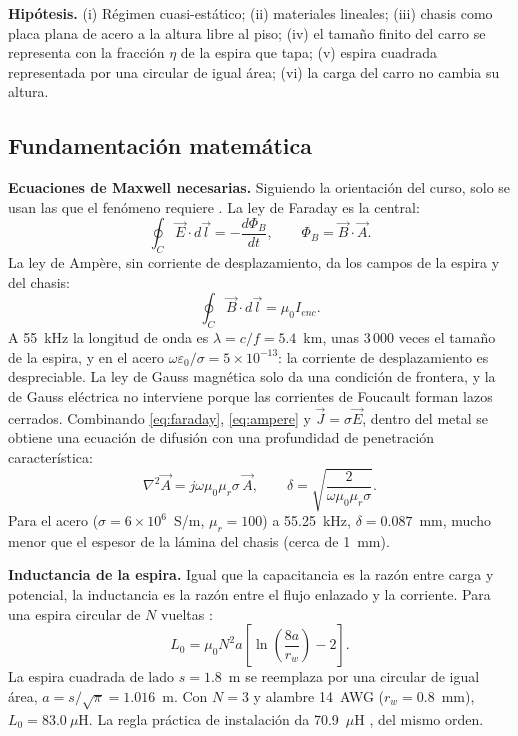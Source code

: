 \documentclass[10pt,onecolumn]{article}
\numberwithin{equation}{section}
\numberwithin{figure}{section}
\numberwithin{table}{section}
\begin{document}
\textbf{Hipótesis.} (i) Régimen cuasi-estático; (ii) materiales lineales; (iii) chasis como placa plana de acero a
la altura libre al piso; (iv) el tamaño finito del carro se representa con la fracción $\eta$ de la espira que tapa;
(v) espira cuadrada representada por una circular de igual área; (vi) la carga del carro no cambia su altura.

\subsection{Fundamentación matemática}

\textbf{Ecuaciones de Maxwell necesarias.} Siguiendo la orientación del curso, solo se usan las que el fenómeno
requiere \cite{griffiths2017,jackson1999}. La ley de Faraday es la central:
\begin{equation}
 \oint_C \vec E\cdot d\vec l = -\frac{d\Phi_B}{dt},\qquad \Phi_B=\vec B\cdot\vec A .
 \label{eq:faraday}
\end{equation}
La ley de Ampère, sin corriente de desplazamiento, da los campos de la espira y del chasis:
\begin{equation}
 \oint_C \vec B\cdot d\vec l = \mu_0 I_{enc}.
 \label{eq:ampere}
\end{equation}
A 55~kHz la longitud de onda es $\lambda=c/f=5.4$~km, unas 3\,000 veces el tamaño de la espira, y en el acero
$\omega\varepsilon_0/\sigma=5\times10^{-13}$: la corriente de desplazamiento es despreciable. La ley de Gauss
magnética solo da una condición de frontera, y la de Gauss eléctrica no interviene porque las corrientes de Foucault
forman lazos cerrados. Combinando \eqref{eq:faraday}, \eqref{eq:ampere} y $\vec J=\sigma\vec E$, dentro del metal
se obtiene una ecuación de difusión con una profundidad de penetración característica:
\begin{equation}
 \nabla^2\vec A = j\omega\mu_0\mu_r\sigma\,\vec A ,
 \qquad
 \delta=\sqrt{\frac{2}{\omega\mu_0\mu_r\sigma}} .
 \label{eq:difusion}
\end{equation}
Para el acero ($\sigma=6\times10^6$~S/m, $\mu_r=100$) a 55.25~kHz, $\delta=0.087$~mm, mucho menor que el espesor de
la lámina del chasis (cerca de 1~mm).

\textbf{Inductancia de la espira.} Igual que la capacitancia es la razón entre carga y potencial, la inductancia
es la razón entre el flujo enlazado y la corriente. Para una espira circular de $N$ vueltas \cite{grover2004}:
\begin{equation}
 L_0=\mu_0N^2a\left[\ln\left(\frac{8a}{r_w}\right)-2\right].
 \label{eq:espira}
\end{equation}
La espira cuadrada de lado $s=1.8$~m se reemplaza por una circular de igual área, $a=s/\sqrt\pi=1.016$~m. Con
$N=3$ y alambre 14~AWG ($r_w=0.8$~mm), $L_0=83.0~\mu$H. La regla práctica de instalación da 70.9~$\mu$H
\cite{fhwa2006}, del mismo orden.
\end{document}
